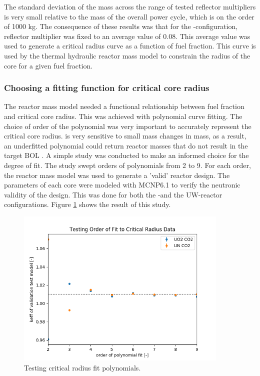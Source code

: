 The standard deviation of the mass across the range of tested reflector
multipliers is very small relative to the mass of the overall power cycle,
which is on the order of 1000 kg. The consequence of these results was that for the \uox-\codiox configuration, reflector multiplier was fixed to an
average value of 0.08. This average value was used to generate a critical radius
curve as a function of fuel fraction. This curve is used by the thermal
hydraulic reactor mass model to constrain the radius of the core for a given
fuel fraction. 


\subsubsection{Choosing a fitting function for critical core radius}
The reactor mass model needed a functional relationship between fuel fraction
and critical core radius. This was achieved with polynomial curve fitting. The
choice of order of the polynomial was very important to accurately represent the
critical core radius. \keff is very sensitive to small mass changes in mass, as
a result, an underfitted polynomial could return reactor masses that do not
result in the target BOL \keff. A simple study was conducted to make an informed
choice for the degree of fit. The study swept orders of polynomials from 2 to 9.
For each order, the reactor mass model was used to generate a 'valid' reactor
design. The parameters of each core were modeled with MCNP6.1 to verify the
neutronic validity of the design. This was done for both the \uox-\codiox and
the UW-\codiox reactor configurations. Figure \ref{fig:fit_order_test} shows the
result of this study.

\begin{figure}[h]
    \centering
    \includegraphics[width=4in]{../images/poly_order_test.png}
\caption{Testing critical radius fit polynomials.}
\label{fig:fit_order_test}
\end{figure}


